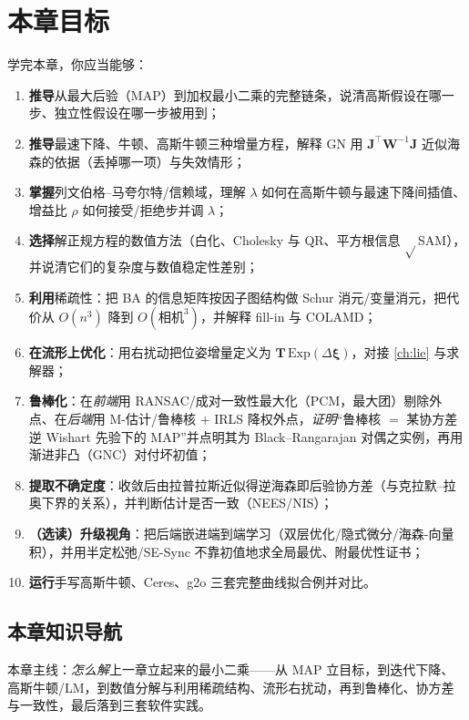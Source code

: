 \section*{本章目标}
学完本章，你应当能够：
\begin{enumerate}
  \item \textbf{推导}从最大后验（MAP）到加权最小二乘的完整链条，说清高斯假设在哪一步、独立性假设在哪一步被用到；
  \item \textbf{推导}最速下降、牛顿、高斯牛顿三种增量方程，解释 GN 用 $\mathbf{J}^\top\mathbf{W}^{-1}\mathbf{J}$ 近似海森的依据（丢掉哪一项）与失效情形；
  \item \textbf{掌握}列文伯格–马夸尔特/信赖域，理解 $\lambda$ 如何在高斯牛顿与最速下降间插值、增益比 $\rho$ 如何接受/拒绝步并调 $\lambda$；
  \item \textbf{选择}解正规方程的数值方法（白化、Cholesky 与 QR、平方根信息 $\sqrt{}$SAM），并说清它们的复杂度与数值稳定性差别；
  \item \textbf{利用}稀疏性：把 BA 的信息矩阵按因子图结构做 Schur 消元/变量消元，把代价从 $O(n^3)$ 降到 $O(\text{相机}^3)$，并解释 fill-in 与 COLAMD；
  \item \textbf{在流形上优化}：用右扰动把位姿增量定义为 $\mathbf{T}\,\mathrm{Exp}(\Delta\boldsymbol{\xi})$，对接 \cref{ch:lie} 与求解器；
  \item \textbf{鲁棒化}：在\emph{前端}用 RANSAC/成对一致性最大化（PCM，最大团）剔除外点、在\emph{后端}用 M-估计/鲁棒核 $+$ IRLS 降权外点，\emph{证明}“鲁棒核 $=$ 某协方差逆 Wishart 先验下的 MAP”并点明其为 Black--Rangarajan 对偶之实例，再用渐进非凸（GNC）对付坏初值；
  \item \textbf{提取不确定度}：收敛后由拉普拉斯近似得逆海森即后验协方差（与克拉默–拉奥下界的关系），并判断估计是否一致（NEES/NIS）；
  \item \textbf{（选读）升级视角}：把后端嵌进端到端学习（双层优化/隐式微分/海森-向量积），并用半定松弛/SE-Sync 不靠初值地求全局最优、附最优性证书；
  \item \textbf{运行}手写高斯牛顿、Ceres、g2o 三套完整曲线拟合例并对比。
\end{enumerate}

\subsection*{本章知识导航}
本章主线：\emph{怎么解}上一章立起来的最小二乘——从 MAP 立目标，到迭代下降、高斯牛顿/LM，到数值分解与利用稀疏结构、流形右扰动，再到鲁棒化、协方差与一致性，最后落到三套软件实践。


